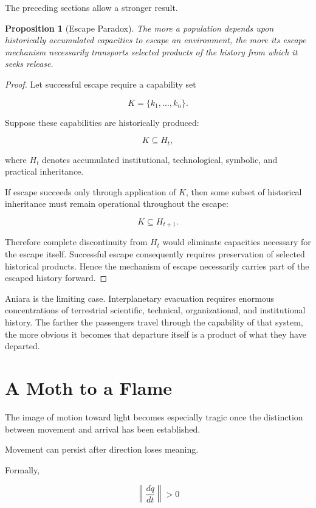 \documentclass[11pt,oneside]{book}
\newtheorem{proposition}[theorem]{Proposition}
\theoremstyle{definition}
\theoremstyle{remark}
\begin{document}
The preceding sections allow a stronger result.

\begin{proposition}[Escape Paradox]
The more a population depends upon historically accumulated capacities to escape an environment, the more its escape mechanism necessarily transports selected products of the history from which it seeks release.
\end{proposition}

\begin{proof}
Let successful escape require a capability set

\[
K=\{k_1,\ldots,k_n\}.
\]

Suppose these capabilities are historically produced:

\[
K\subseteq H_t,
\]

where \(H_t\) denotes accumulated institutional, technological, symbolic, and practical inheritance.

If escape succeeds only through application of \(K\), then some subset of historical inheritance must remain operational throughout the escape:

\[
K\subseteq H_{t+1}.
\]

Therefore complete discontinuity from \(H_t\) would eliminate capacities necessary for the escape itself. Successful escape consequently requires preservation of selected historical products. Hence the mechanism of escape necessarily carries part of the escaped history forward.
\end{proof}

Aniara is the limiting case. Interplanetary evacuation requires enormous concentrations of terrestrial scientific, technical, organizational, and institutional history. The farther the passengers travel through the capability of that system, the more obvious it becomes that departure itself is a product of what they have departed.

\section{A Moth to a Flame}

The image of motion toward light becomes especially tragic once the distinction between movement and arrival has been established.

Movement can persist after direction loses meaning.

Formally,

\[
\left\|
\frac{dq}{dt}
\right\|>0
\]
\end{document}
